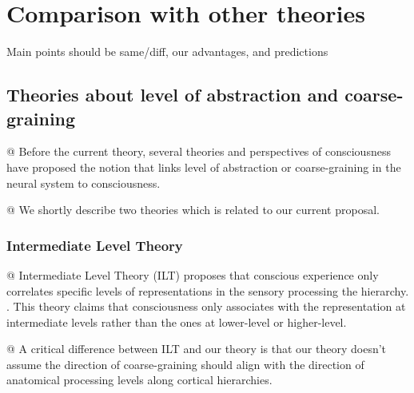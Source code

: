 \documentclass[utf8]{article}
\newenvironment{ants}
			{
			 \begin{easylist}[itemize]		
		 	}
			{
			\end{easylist}
			}
\newcommand{\ideaBox}[1]{
				\begin{tcolorbox}[%
					width=12cm,
					sharp corners=downhill, 
					hyphenationfix, 
					arc=8pt,
					colback=Thistle!50!white, 
					flush right,
					halign=flush right,
					]%
					#1
				\end{tcolorbox}
			}
\begin{document}
	

	\section{Comparison with other theories}
		\ideaBox{Main points should be same/diff, our advantages, and predictions}
		
	
		\subsection{Theories about level of abstraction and coarse-graining}
			\begin{ants}
				@ Before the current theory, several theories and perspectives of consciousness have proposed the notion that links level of abstraction or coarse-graining in the neural system to consciousness. 
				
				@ We shortly describe two theories which is  related to our current proposal. 
			\end{ants}
			
			
			\subsubsection{Intermediate Level Theory}
				\begin{ants}
					@ Intermediate Level Theory (ILT) proposes that conscious experience only correlates specific levels of representations in the sensory processing the hierarchy. \citep{prinz2007intermediate, jackendoff1987consciousness}. This theory claims that consciousness only associates with the representation at  intermediate levels rather than the ones at lower-level or higher-level. 
					
					
					@ A critical difference between ILT and our theory is that our theory doesn't assume the direction of coarse-graining should align with the direction of  anatomical processing levels along cortical hierarchies.
				\end{ants}
			
\end{document}

